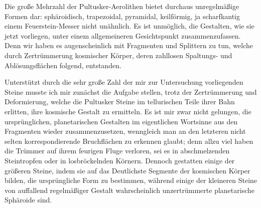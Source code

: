 \documentclass[a4paper, 11pt, oneside, german]{article}
\begin{document}
Die große Mehrzahl der Pultusker-Aerolithen bietet durchaus unregelmäßige Formen dar: sphäroidisch, trapezoidal, pyramidal, keilförmig, ja scharfkantig einem Feuerstein-Messer nicht unähnlich. Es ist unmöglich, die Gestalten, wie sie jetzt vorliegen, unter einem allgemeineren Gesichtspunkt zusammenzufassen. Denn wir haben es augenscheinlich mit Fragmenten und Splittern zu tun, welche durch Zertrümmerung kosmischer Körper, deren zahllosen Spaltungs- und Ablösungsflächen folgend, entstanden.

Unterstützt durch die sehr große Zahl der mir zur Untersuchung vorliegenden Steine musste ich mir zunächst die Aufgabe stellen, trotz der Zertrümmerung und Deformierung, welche die Pultusker Steine im tellurischen Teile ihrer Bahn erlitten, ihre kosmische Gestalt zu ermitteln. Es ist mir zwar nicht gelungen, die ursprünglichen, planetarischen Gestalten im eigentlichen Wortsinne aus den Fragmenten wieder zusammenzusetzen, wenngleich man an den letzteren nicht selten korrespondierende Bruchflächen zu erkennen glaubt; denn allzu viel haben die Trümmer auf ihrem feurigen Fluge verloren, sei es in abschmelzenden Steintropfen oder in losbröckelnden Körnern. Dennoch gestatten einige der größeren Steine, indem sie auf das Deutlichste Segmente der kosmischen Körper bilden, die ursprüngliche Form zu bestimmen, während einige der kleineren Steine von auffallend regelmäßiger Gestalt wahrscheinlich unzertrümmerte planetarische Sphäroide sind.
\end{document}

